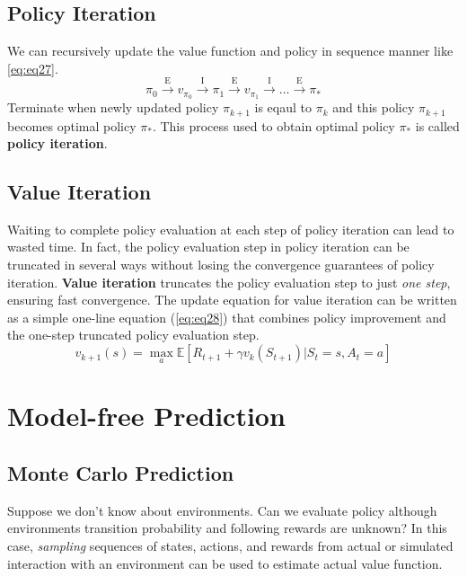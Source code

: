 \documentclass[
	10pt, %
]{article}
\newcommand{\mrm}[1]{\mathrm{#1}}
\newcommand{\mbb}[1]{\mathbb{#1}}
\newcommand{\tb}[1]{\textbf{#1}}
\newcommand{\ti}[1]{\textit{#1}}
\numberwithin{equation}{subsection} %
\begin{document}
\subsection{Policy Iteration}
We can recursively update the value function and policy in sequence manner like \cref{eq:eq27}.
\begin{equation} \label{eq:eq27}
    \pi_0 \xrightarrow{\mrm{E}} v_{\pi_0} \xrightarrow{\mrm{I}} \pi_1 \xrightarrow{\mrm{E}} v_{\pi_1} \xrightarrow{\mrm{I}} \dots \xrightarrow{\mrm{E}} \pi_*
\end{equation}
Terminate when newly updated policy $\pi_{k+1}$ is eqaul to $\pi_k$ and this policy $\pi_{k+1}$ becomes optimal policy $\pi_*$. This process used to obtain optimal policy $\pi_*$ is called \tb{policy iteration}.

\subsection{Value Iteration}
Waiting to complete policy evaluation at each step of policy iteration can lead to wasted time. In fact, the policy evaluation step in policy iteration can be truncated in several ways without losing the convergence guarantees of policy iteration. \tb{Value iteration} truncates the policy evaluation step to just \ti{one step}, ensuring fast convergence. The update equation for value iteration can be written as a simple one-line equation (\cref{eq:eq28}) that combines policy improvement and the one-step truncated policy evaluation step.
\begin{equation} \label{eq:eq28}
    v_{k+1}(s) = \max_a \mbb{E} [R_{t+1} + \gamma v_k(S_{t+1}) | S_t=s, A_t=a]
\end{equation}
\newpage



\section{Model-free Prediction}
\subsection{Monte Carlo Prediction}
Suppose we don't know about environments. Can we evaluate policy although environments transition probability and following rewards are unknown? In this case, \ti{sampling} sequences of states, actions, and rewards from actual or simulated interaction with an environment can be used to estimate actual value function.
\end{document}
